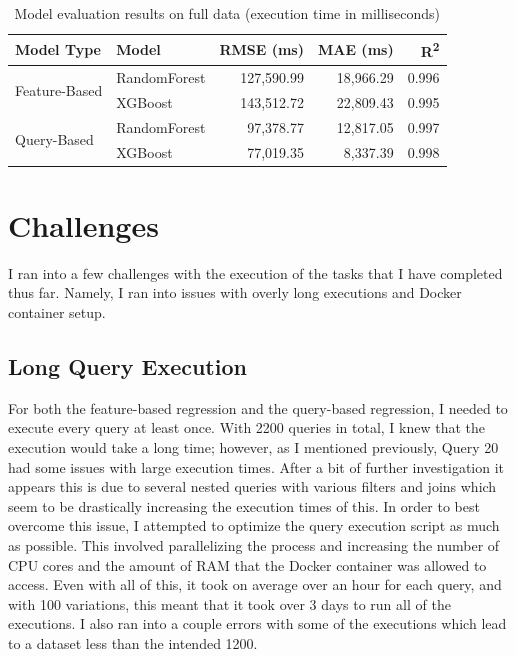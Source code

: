 \documentclass[sigconf]{acmart}
\begin{document}
\begin{table}[h!]
  \centering
  \begin{tabular}{|l|l|r|r|r|}
    \hline
    \textbf{Model Type} & \textbf{Model}  & \textbf{RMSE (ms)} & \textbf{MAE (ms)} & \textbf{R\textsuperscript{2}} \\
    \hline
    \multirow{2}{*}{Feature-Based} 
      & RandomForest & 127,590.99 & 18,966.29 & 0.996 \\
      & XGBoost      & 143,512.72 & 22,809.43 & 0.995 \\
    \hline
    \multirow{2}{*}{Query-Based} 
      & RandomForest & 97,378.77 & 12,817.05 & 0.997 \\
      & XGBoost      & 77,019.35 & 8,337.39  & 0.998 \\
    \hline
  \end{tabular}
  \caption{Model evaluation results on full data (execution time in milliseconds)}
  \label{tab:model-evaluation}
\end{table}


\section{Challenges}
I ran into a few challenges with the execution of the tasks that I have completed thus far. Namely, I ran into issues with overly long executions and  Docker container setup.

\subsection{Long Query Execution}
For both the feature-based regression and the query-based regression, I needed to execute every query at least once. With 2200 queries in total, I knew that the execution would
take a long time; however, as I mentioned previously, Query 20 had some issues with large execution times. After a bit of further investigation it appears this is due to several nested
queries with various filters and joins which seem to be drastically increasing the execution times of this. In order to best overcome this issue, I attempted to optimize the query execution
script as much as possible. This involved parallelizing the process and increasing the number of CPU cores and the amount of RAM that the Docker container was allowed to access.
Even with all of this, it took on average over an hour for each query, and with 100 variations, this meant that it took over 3 days to run all of the executions. I also ran into a couple errors
with some of the executions which lead to a dataset less than the intended 1200.
\end{document}
